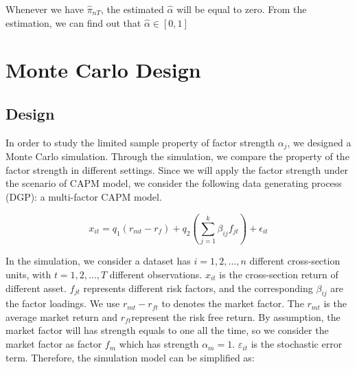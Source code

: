 \documentclass[12pt]{article}
\begin{document}
Whenever we have $\hat{\pi}_{nT}$, the estimated $\hat{\alpha}$ will be equal to zero. 
From the estimation, we can find out that $\hat{\alpha} \in [0,1]$




	\section{Monte Carlo Design}\label{MC}
	\subsection{Design}
In order to study the limited sample property of factor strength $\alpha_j$, we designed a Monte Carlo simulation.
Through the simulation, we compare the property of the factor strength in different settings.
Since we will apply the factor strength under the scenario of CAPM model, we consider the following data generating process (DGP): a multi-factor CAPM model.

\[ x_{it} = q_1({r_{mt}} - r_f) + q_2( \sum_{j=1}^k\beta_{ij}f_{jt}) +\epsilon_{it}  \]


In the simulation, we consider a dataset has $i = 1, 2,\dots, n$ different cross-section units, with $t= 1, 2,\dots, T$ different observations. 
$x_{it}$ is the cross-section return of different asset.
$f_{jt}$ represents different risk factors, and the corresponding  $\beta_{ij}$ are the factor loadings.
We use $r_{mt} - r_{ft}$ to denotes the market factor.
The $r_{mt}$ is the average market return and $r_{ft}$represent the risk free return.
By assumption, the market factor will has strength equals to one all the time, so we consider the market factor as factor $f_{m}$ which has strength $\alpha_m = 1$.
$\varepsilon_{it}$ is the stochastic error term.
Therefore, the simulation model can be simplified as:
\end{document}
